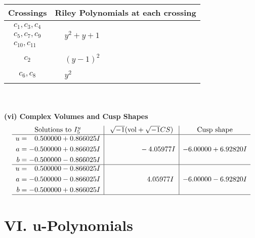 \documentclass[1p]{elsarticle_modified}
\theoremstyle{definition}
\newcommand{\I}{\sqrt{-1}}
\begin{document}
\begin{tabular}{m{50pt}|m{274pt}}
Crossings & \hspace{64pt}Riley Polynomials at each crossing \\
\hline $$\begin{aligned}c_{1},c_{3},c_{4}\\c_{5},c_{7},c_{9}\\c_{10},c_{11}\end{aligned}$$&$\begin{aligned}
&y^2+y+1
\end{aligned}$\\
\hline $$\begin{aligned}c_{2}\end{aligned}$$&$\begin{aligned}
&(y-1)^2
\end{aligned}$\\
\hline $$\begin{aligned}c_{6},c_{8}\end{aligned}$$&$\begin{aligned}
&y^2
\end{aligned}$\\
\hline
\end{tabular}\\~\\
\newpage\flushleft \textbf{(vi) Complex Volumes and Cusp Shapes}
$$\begin{array}{c|c|c}  
\text{Solutions to }I^u_{5}& \I (\text{vol} + \sqrt{-1}CS) & \text{Cusp shape}\\
 \hline 
\begin{aligned}
u &= \phantom{-}0.500000 + 0.866025 I \\
a &= -0.500000 + 0.866025 I \\
b &= -0.500000 - 0.866025 I\end{aligned}
 & \phantom{-0.000000 } -4.05977 I & -6.00000 + 6.92820 I \\ \hline\begin{aligned}
u &= \phantom{-}0.500000 - 0.866025 I \\
a &= -0.500000 - 0.866025 I \\
b &= -0.500000 + 0.866025 I\end{aligned}
 & \phantom{-0.000000 -}4.05977 I & -6.00000 - 6.92820 I\\
 \hline 
 \end{array}$$\newpage
\newpage\renewcommand{\arraystretch}{1}
\centering \section*{ VI. u-Polynomials}
\end{document}
